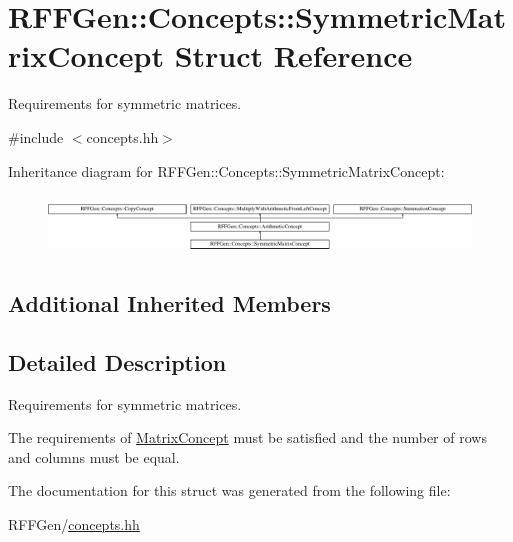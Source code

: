\hypertarget{structRFFGen_1_1Concepts_1_1SymmetricMatrixConcept}{\section{R\-F\-F\-Gen\-:\-:Concepts\-:\-:Symmetric\-Matrix\-Concept Struct Reference}
\label{structRFFGen_1_1Concepts_1_1SymmetricMatrixConcept}
}


Requirements for symmetric matrices.  




{\ttfamily \#include $<$concepts.\-hh$>$}

Inheritance diagram for R\-F\-F\-Gen\-:\-:Concepts\-:\-:Symmetric\-Matrix\-Concept\-:\begin{figure}[H]
\begin{center}
\leavevmode
\includegraphics[height=1.586402cm]{structRFFGen_1_1Concepts_1_1SymmetricMatrixConcept}
\end{center}
\end{figure}
\subsection*{Additional Inherited Members}


\subsection{Detailed Description}
Requirements for symmetric matrices. 

The requirements of \hyperlink{structRFFGen_1_1Concepts_1_1MatrixConcept}{Matrix\-Concept} must be satisfied and the number of rows and columns must be equal. 

The documentation for this struct was generated from the following file\-:\begin{DoxyCompactItemize}
\item 
R\-F\-F\-Gen/\hyperlink{concepts_8hh}{concepts.\-hh}\end{DoxyCompactItemize}
